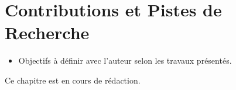 
\chapter{Contributions et Pistes de Recherche}
\label{chap:contributions}


\begin{boxobjectifs}
\begin{itemize}
    \item Objectifs à définir avec l'auteur selon les travaux présentés.
\end{itemize}
\end{boxobjectifs}

\begin{boxalert}
Ce chapitre est en cours de rédaction.
\end{boxalert}
